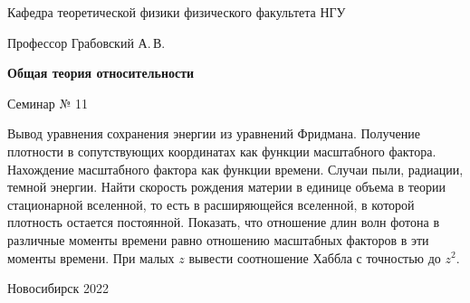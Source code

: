 \documentclass[12pt,pagesize,paper=192mm:108mm,landscape]{scrbook}
\begin{document}
\begin{titlepage}
\begin{center}
    Кафедра теоретической физики физического факультета НГУ

    \Large
    Профессор Грабовский А.\,В.

    \huge
    \textbf{Общая теория относительности}

    \Large
    Семинар № 11
    \vfill

    \normalsize
    \begin{minipage}{0.83\linewidth}
      Вывод уравнения сохранения энергии из уравнений
      Фридмана. Получение плотности в сопутствующих координатах как
      функции масштабного фактора. Нахождение масштабного фактора как
      функции времени. Случаи пыли, радиации, темной энергии. Найти
      скорость рождения материи в единице объема в теории
      стационарной
      вселенной, то есть в расширяющейся вселенной, 
      в которой
      плотность остается постоянной. Показать, что отношение длин волн
      фотона в различные моменты времени равно отношению масштабных
      факторов в эти моменты времени. При малых $z$ вывести
      соотношение Хаббла с точностью до $z^2$.
    \end{minipage}
    \vfill

    \normalsize \ccbysa\hspace{0.5em}  Новосибирск 2022
  \end{center}
\end{titlepage}
\end{document}
